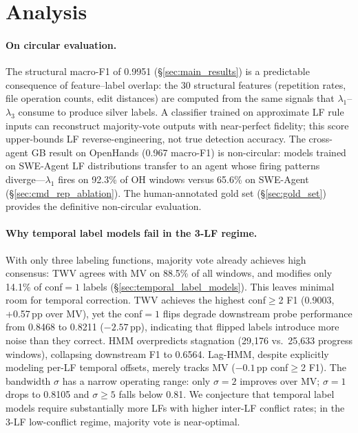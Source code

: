 \section{Analysis}
\label{sec:analysis}

\paragraph{On circular evaluation.}
The structural macro-F1 of 0.9951 (\S\ref{sec:main_results}) is a predictable consequence of feature--label overlap: the 30 structural features (repetition rates, file operation counts, edit distances) are computed from the same signals that $\lambda_1$--$\lambda_3$ consume to produce silver labels.
A classifier trained on approximate LF rule inputs can reconstruct majority-vote outputs with near-perfect fidelity; this score upper-bounds LF reverse-engineering, not true detection accuracy.
The cross-agent GB result on OpenHands (0.967 macro-F1) is non-circular: models trained on SWE-Agent LF distributions transfer to an agent whose firing patterns diverge---$\lambda_1$ fires on 92.3\% of OH windows versus 65.6\% on SWE-Agent (\S\ref{sec:cmd_rep_ablation}).
The human-annotated gold set (\S\ref{sec:gold_set}) provides the definitive non-circular evaluation.

\paragraph{Why temporal label models fail in the 3-LF regime.}
With only three labeling functions, majority vote already achieves high consensus: TWV agrees with MV on 88.5\% of all windows, and modifies only 14.1\% of conf${=}1$ labels (\S\ref{sec:temporal_label_models}).
This leaves minimal room for temporal correction.
TWV achieves the highest conf${\geq}$2 F1 (0.9003, +0.57\,pp over MV), yet the conf${=}1$ flips degrade downstream probe performance from 0.8468 to 0.8211 ($-2.57$\,pp), indicating that flipped labels introduce more noise than they correct.
HMM overpredicts stagnation (29{,}176 vs.\ 25{,}633 progress windows), collapsing downstream F1 to 0.6564.
Lag-HMM, despite explicitly modeling per-LF temporal offsets, merely tracks MV ($-0.1$\,pp conf${\geq}$2 F1).
The bandwidth $\sigma$ has a narrow operating range: only $\sigma{=}2$ improves over MV; $\sigma{=}1$ drops to 0.8105 and $\sigma{\geq}5$ falls below 0.81.
We conjecture that temporal label models require substantially more LFs with higher inter-LF conflict rates; in the 3-LF low-conflict regime, majority vote is near-optimal.

